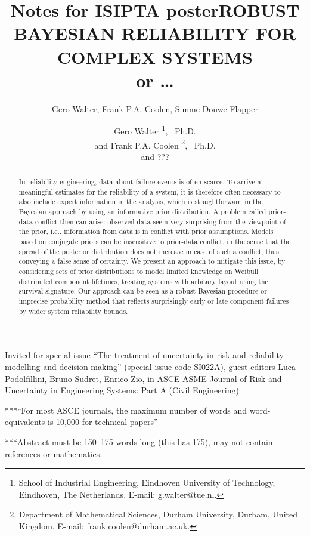 \documentclass[Journal,SectionNumbers,SingleSpace,InsideFigs]{ascelike}
\title{Notes for ISIPTA poster}
\author{Gero Walter, Frank P.A. Coolen, Simme Douwe Flapper}
\begin{document}
\title{ROBUST BAYESIAN RELIABILITY FOR COMPLEX SYSTEMS\\ or \ldots}

\author{
Gero Walter%
\thanks{
School of Industrial Engineering,
Eindhoven University of Technology, Eindhoven, The Netherlands.
E-mail: g.walter@tue.nl.},
\ Ph.D.
\\
and
Frank P.A. Coolen%
\thanks{
Department of Mathematical Sciences,
Durham University, Durham, United Kingdom.
E-mail: frank.coolen@durham.ac.uk.},
\ Ph.D.
\\
and ???
}

\maketitle

Invited for special issue ``The treatment of uncertainty in risk and reliability modelling and decision making''
(special issue code SI022A), guest editors Luca Podolfillini, Bruno Sudret, Enrico Zio,
in ASCE-ASME Journal of Risk and Uncertainty in Engineering Systems: Part A (Civil Engineering)

***``For most ASCE journals, the maximum number of words and word-equivalents is 10,000 for technical papers''

***Abstract must be 150--175 words long (this has 175), may not contain references or mathematics.

\begin{abstract}
In reliability engineering, data about failure events is often scarce.
To arrive at meaningful estimates for the reliability of a system,
it is therefore often necessary to also include expert information in the analysis,
which is straightforward in the Bayesian approach by using an informative prior distribution.
%
A problem called prior-data conflict then can arise:
observed data seem very surprising from the viewpoint of the prior,
i.e., information from data is in conflict with prior assumptions.
Models based on conjugate priors can be insensitive to prior-data conflict,
in the sense that the spread of the posterior distribution does not increase in case of such a conflict,
thus conveying a false sense of certainty.
%
We present an approach to mitigate this issue, by considering sets of prior distributions
to model limited knowledge on Weibull distributed component lifetimes,
treating systems with arbitary layout using the survival signature.
Our approach can be seen as a robust Bayesian procedure or imprecise probability method
that reflects surprisingly early or late component failures
by wider system reliability bounds.
%
\end{abstract}
\end{document}
